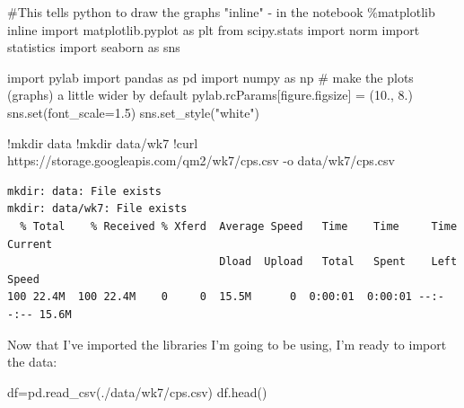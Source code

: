 \documentclass[
  letterpaper,
  DIV=11,
  numbers=noendperiod]{scrreprt}
\newenvironment{Shaded}{\begin{snugshade}}{\end{snugshade}}
\newcommand{\BuiltInTok}[1]{\textcolor[rgb]{0.00,0.23,0.31}{#1}}
\newcommand{\CommentTok}[1]{\textcolor[rgb]{0.37,0.37,0.37}{#1}}
\newcommand{\FloatTok}[1]{\textcolor[rgb]{0.68,0.00,0.00}{#1}}
\newcommand{\ImportTok}[1]{\textcolor[rgb]{0.00,0.46,0.62}{#1}}
\newcommand{\NormalTok}[1]{\textcolor[rgb]{0.00,0.23,0.31}{#1}}
\newcommand{\OperatorTok}[1]{\textcolor[rgb]{0.37,0.37,0.37}{#1}}
\newcommand{\StringTok}[1]{\textcolor[rgb]{0.13,0.47,0.30}{#1}}
\begin{document}
\begin{Shaded}
\begin{Highlighting}[]
\CommentTok{\#This tells python to draw the graphs "inline" {-} in the notebook}
\OperatorTok{\%}\NormalTok{matplotlib inline  }
\ImportTok{import}\NormalTok{ matplotlib.pyplot }\ImportTok{as}\NormalTok{ plt}
\ImportTok{from}\NormalTok{ scipy.stats }\ImportTok{import}\NormalTok{ norm}
\ImportTok{import}\NormalTok{ statistics}
\ImportTok{import}\NormalTok{ seaborn }\ImportTok{as}\NormalTok{ sns}

\ImportTok{import}\NormalTok{ pylab}
\ImportTok{import}\NormalTok{ pandas }\ImportTok{as}\NormalTok{ pd}
\ImportTok{import}\NormalTok{ numpy }\ImportTok{as}\NormalTok{ np}
\CommentTok{\# make the plots (graphs) a little wider by default}
\NormalTok{pylab.rcParams[}\StringTok{\textquotesingle{}figure.figsize\textquotesingle{}}\NormalTok{] }\OperatorTok{=}\NormalTok{ (}\FloatTok{10.}\NormalTok{, }\FloatTok{8.}\NormalTok{)}
\NormalTok{sns.}\BuiltInTok{set}\NormalTok{(font\_scale}\OperatorTok{=}\FloatTok{1.5}\NormalTok{)}
\NormalTok{sns.set\_style(}\StringTok{"white"}\NormalTok{)}
\end{Highlighting}
\end{Shaded}

\begin{Shaded}
\begin{Highlighting}[]
\OperatorTok{!}\NormalTok{mkdir data}
\OperatorTok{!}\NormalTok{mkdir data}\OperatorTok{/}\NormalTok{wk7}
\OperatorTok{!}\NormalTok{curl https:}\OperatorTok{//}\NormalTok{storage.googleapis.com}\OperatorTok{/}\NormalTok{qm2}\OperatorTok{/}\NormalTok{wk7}\OperatorTok{/}\NormalTok{cps.csv }\OperatorTok{{-}}\NormalTok{o data}\OperatorTok{/}\NormalTok{wk7}\OperatorTok{/}\NormalTok{cps.csv}
\end{Highlighting}
\end{Shaded}

\begin{verbatim}
mkdir: data: File exists
mkdir: data/wk7: File exists
  % Total    % Received % Xferd  Average Speed   Time    Time     Time  Current
                                 Dload  Upload   Total   Spent    Left  Speed
100 22.4M  100 22.4M    0     0  15.5M      0  0:00:01  0:00:01 --:--:-- 15.6M
\end{verbatim}

Now that I've imported the libraries I'm going to be using, I'm ready to
import the data:

\begin{Shaded}
\begin{Highlighting}[]
\NormalTok{df}\OperatorTok{=}\NormalTok{pd.read\_csv(}\StringTok{\textquotesingle{}./data/wk7/cps.csv\textquotesingle{}}\NormalTok{)}
\NormalTok{df.head()}
\end{Highlighting}
\end{Shaded}
\end{document}
